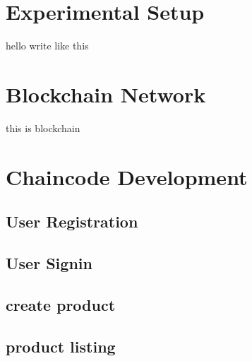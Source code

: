 \section{ Experimental Setup}
\noindent hello write like this 
\

\section{Blockchain Network}
\noindent this is blockchain 

\section{Chaincode Development}
\lipsum[22-25]
\subsection{User Registration}

\subsection{User Signin}

\subsection{create product}

\subsection{product listing}








